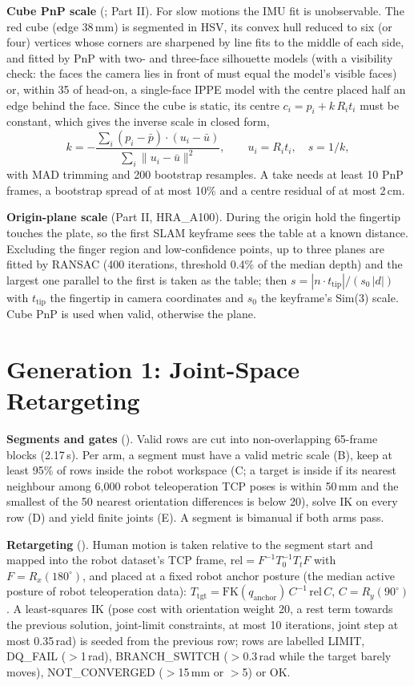 \documentclass[conference,10pt]{IEEEtran}
\newcommand{\mm}{\,mm\xspace}
\begin{document}
\textbf{Cube PnP scale} (; Part II). For slow motions the IMU fit is unobservable. The red
cube (edge 38\mm) is segmented in HSV, its convex hull reduced to six (or four) vertices whose corners are sharpened by line fits
to the middle of each side, and fitted by PnP with two- and three-face silhouette models (with a visibility check: the faces the
camera lies in front of must equal the model's visible faces) or, within 35\textdegree{} of head-on, a single-face IPPE model with
the centre placed half an edge behind the face. Since the cube is static, its centre $c_i=p_i + k\,R_i t_i$ must be constant, which
gives the inverse scale in closed form,
\begin{equation}
k = -\frac{\sum_i (p_i-\bar p)\cdot(u_i-\bar u)}{\sum_i\lVert u_i-\bar u\rVert^2},\qquad u_i=R_i t_i,\quad s=1/k,
\end{equation}
with MAD trimming and 200 bootstrap resamples. A take needs at least 10 PnP frames, a bootstrap spread of at most 10\% and a
centre residual of at most 2\,cm.

\textbf{Origin-plane scale} (Part II, HRA\_A100). During the origin hold the fingertip touches the plate, so the first SLAM keyframe
sees the table at a known distance. Excluding the finger region and low-confidence points, up to three planes are fitted by RANSAC
(400 iterations, threshold 0.4\% of the median depth) and the largest one parallel to the first is taken as the table; then
$s=|n\cdot t_\text{tip}|/(s_0\,|d|)$ with $t_\text{tip}$ the fingertip in camera coordinates and $s_0$ the keyframe's Sim(3) scale.
Cube PnP is used when valid, otherwise the plane.

\section{Generation 1: Joint-Space Retargeting}\label{m:sec:gen1}
\textbf{Segments and gates} (). Valid rows are cut into non-overlapping 65-frame blocks (2.17\,s). Per arm, a
segment must have a valid metric scale (B), keep at least 95\% of rows inside the robot workspace (C; a target is inside if its
nearest neighbour among 6{,}000 robot teleoperation TCP poses is within 50\mm{} and the smallest of the 50 nearest orientation
differences is below 20\textdegree), solve IK on every row (D) and yield finite joints (E). A segment is bimanual if both arms
pass.

\textbf{Retargeting} (). Human motion is taken relative to the segment start
and mapped into the robot dataset's TCP frame, $\text{rel}=F^{-1}T_{0}^{-1}T_{t}F$ with $F=R_x(180^\circ)$, and placed at a fixed
robot anchor posture (the median active posture of robot teleoperation data): $T_\text{tgt}=\mathrm{FK}(q_\text{anchor})\,C^{-1}\,
\text{rel}\,C$, $C=R_y(90^\circ)$. A least-squares IK (pose cost with orientation weight 20, a rest term towards the previous
solution, joint-limit constraints, at most 10 iterations, joint step at most 0.35\,rad) is seeded from the previous row; rows are
labelled LIMIT, DQ\_FAIL ($>$1\,rad), BRANCH\_SWITCH ($>$0.3\,rad while the target barely moves), NOT\_CONVERGED ($>$15\mm{} or
$>$5\textdegree) or OK.
\end{document}
